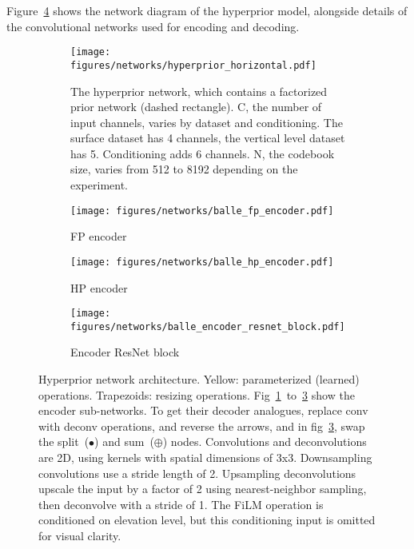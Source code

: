 \documentclass[11pt, a4paper, logo, copyright, numbering]{googledeepmind}
\begin{document}
Figure~\ref{fig:balle} shows the network diagram of the hyperprior model, alongside details of the convolutional networks used for encoding and decoding.
\begin{figure}
    \centering
\begin{subfigure}[t]{\textwidth}
        \centering
        \texttt{[image: figures/networks/hyperprior\_horizontal.pdf]}
        \caption{The hyperprior network, which contains a factorized prior network (dashed rectangle). C, the number of input channels, varies by dataset and conditioning. The surface dataset has 4 channels, the vertical level dataset has 5. Conditioning adds 6 channels. N, the codebook size, varies from 512 to 8192 depending on the experiment.}
    \end{subfigure}
\par\bigskip \hfill
    \begin{subfigure}[b]{.3\textwidth}
        \centering
        \texttt{[image: figures/networks/balle\_fp\_encoder.pdf]}
        \caption{FP encoder\label{fig:balle:fp_encoder}}
    \end{subfigure}
    \hfill
    \begin{subfigure}[b]{0.3\textwidth}
        \centering
        \texttt{[image: figures/networks/balle\_hp\_encoder.pdf]}
        \caption{HP encoder\label{fig:balle:hp_encoder}}
    \end{subfigure}
    \hfill
    \begin{subfigure}[b]{0.3\textwidth}
        \centering
        \texttt{[image: figures/networks/balle\_encoder\_resnet\_block.pdf]}
        \vspace{.4in}
        \caption{Encoder ResNet block\label{fig:balle:resnet}}
    \end{subfigure}
    \hfill
    \caption{Hyperprior network architecture. Yellow: parameterized (learned) operations. Trapezoids: resizing operations. Fig~\ref{fig:balle:fp_encoder}~to~\ref{fig:balle:resnet} show the encoder sub-networks. To get their decoder analogues, replace conv with deconv operations, and reverse the arrows, and in fig~\ref{fig:balle:resnet}, swap the split~($\bullet$) and  sum~($\oplus$) nodes. Convolutions and deconvolutions are 2D, using kernels with spatial dimensions of 3x3. Downsampling convolutions use a stride length of 2. Upsampling deconvolutions upscale the input by a factor of 2 using nearest-neighbor sampling, then deconvolve with a stride of 1. The FiLM operation is conditioned on elevation level, but this conditioning input is omitted for visual clarity.\label{fig:balle}}
\end{figure}
 
\end{document}
